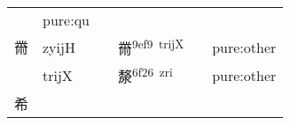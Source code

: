 \documentclass[14pt,a4paper]{scrartcl}
\begin{document}
\begin{longtable}[c]{@{}llllll@{}}
\begin{minipage}[t]{0.14\columnwidth}\raggedright\strut
\strut\end{minipage} &
\begin{minipage}[t]{0.14\columnwidth}\raggedright\strut
pure:qu
\strut\end{minipage}\tabularnewline
\begin{minipage}[t]{0.14\columnwidth}\raggedright\strut
黹
\strut\end{minipage} &
\begin{minipage}[t]{0.14\columnwidth}\raggedright\strut
zyijH
\strut\end{minipage} &
\begin{minipage}[t]{0.14\columnwidth}\raggedright\strut
\strut\end{minipage} &
\begin{minipage}[t]{0.14\columnwidth}\raggedright\strut
黹\textsuperscript{9ef9~trijX}
\strut\end{minipage} &
\begin{minipage}[t]{0.14\columnwidth}\raggedright\strut
\strut\end{minipage} &
\begin{minipage}[t]{0.14\columnwidth}\raggedright\strut
pure:other
\strut\end{minipage}\tabularnewline
\begin{minipage}[t]{0.14\columnwidth}\raggedright\strut
𠩺
\strut\end{minipage} &
\begin{minipage}[t]{0.14\columnwidth}\raggedright\strut
trijX
\strut\end{minipage} &
\begin{minipage}[t]{0.14\columnwidth}\raggedright\strut
\strut\end{minipage} &
\begin{minipage}[t]{0.14\columnwidth}\raggedright\strut
漦\textsuperscript{6f26~zri}
\strut\end{minipage} &
\begin{minipage}[t]{0.14\columnwidth}\raggedright\strut
\strut\end{minipage} &
\begin{minipage}[t]{0.14\columnwidth}\raggedright\strut
pure:other
\strut\end{minipage}\tabularnewline
\begin{minipage}[t]{0.14\columnwidth}\raggedright\strut
希
\strut\end{minipage} &
\begin{minipage}[t]{0.14\columnwidth}\raggedright\strut

\end{minipage}
\end{longtable}
\end{document}
